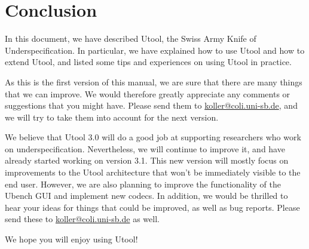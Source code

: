 
\section{Conclusion}  \label{sec:conclusion}

In this document, we have described Utool, the Swiss Army Knife of
Underspecification. In particular, we have explained how to use Utool
and how to extend Utool, and listed some tips and experiences on using
Utool in practice.

As this is the first version of this manual, we are sure that there
are many things that we can improve. We would therefore greatly
appreciate any comments or suggestions that you might have. Please
send them to \url{koller@coli.uni-sb.de}, and we will try to take them
into account for the next version. 

We believe that Utool 3.0 will do a good job at supporting researchers
who work on underspecification. Nevertheless, we will continue to
improve it, and have already started working on version 3.1. This new
version will mostly focus on improvements to the Utool architecture
that won't be immediately visible to the end user. However, we are
also planning to improve the functionality of the Ubench GUI and
implement new codecs. In addition, we would be thrilled to hear your
ideas for things that could be improved, as well as bug
reports. Please send these to \url{koller@coli.uni-sb.de} as well.

We hope you will enjoy using Utool!





